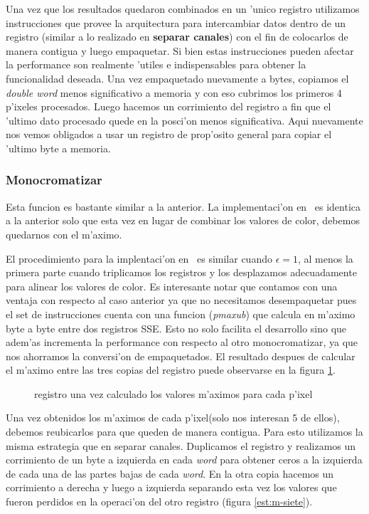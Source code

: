 Una vez que los resultados quedaron combinados en un 'unico registro utilizamos instrucciones que provee la arquitectura para intercambiar datos dentro de un registro (similar a lo realizado en \textbf{separar canales}) con el fin de colocarlos de manera contigua y luego empaquetar. Si bien 
estas instrucciones pueden afectar la performance son realmente  'utiles e indispensables para obtener la funcionalidad deseada. Una vez empaquetado nuevamente a bytes, copiamos el \textit{double word} menos significativo a memoria y con eso cubrimos los primeros 4 p'ixeles procesados.
Luego hacemos un corrimiento del registro a fin que el 'ultimo dato procesado quede en la posci'on menos significativa. Aqui nuevamente nos vemos obligados a usar un registro de prop'osito general para copiar el 'ultimo byte a memoria.

\subsubsection{Monocromatizar \protect{$\epsilon = \infty $} }
Esta funcion es bastante similar a la anterior. La implementaci'on en \C\ es identica a la anterior solo que esta vez en lugar de combinar los valores de color, debemos quedarnos con el m'aximo.

El procedimiento para la implentaci'on en \ass\ es similar cuando  $\epsilon= 1$, al menos la primera parte cuando triplicamos los registros y los desplazamos adecuadamente para alinear los valores de color. Es interesante notar que contamos con una ventaja con respecto al caso anterior ya que no necesitamos desempaquetar pues el set de instrucciones cuenta con una funcion (\textit{pmaxub}) que calcula en m'aximo byte a byte entre dos registros SSE. Esto no solo facilita el desarrollo sino que adem'as incrementa la performance con respecto al otro monocromatizar, ya que nos ahorramos la conversi'on de empaquetados. El resultado despues de calcular el m'aximo entre las tres copias del registro puede observarse en la figura \ref{est:m-seis}.

\begin{figure}[h!]
\caption{registro una vez calculado los valores m'aximos para cada p'ixel}
\label{est:m-seis}
\end{figure}

Una vez obtenidos los m'aximos de cada p'ixel(solo nos interesan 5 de ellos), debemos reubicarlos para que queden de manera contigua. Para esto utilizamos la misma estrategia que en separar canales. Duplicamos el registro y realizamos un corrimiento de un byte a izquierda en cada \textit{word} para obtener ceros a la izquierda de cada una de las partes bajas de cada \textit{word}. En la otra copia hacemos un corrimiento a derecha y luego a izquierda separando esta vez los valores que fueron perdidos en la operaci'on del otro registro (figura \ref{est:m-siete}). 


